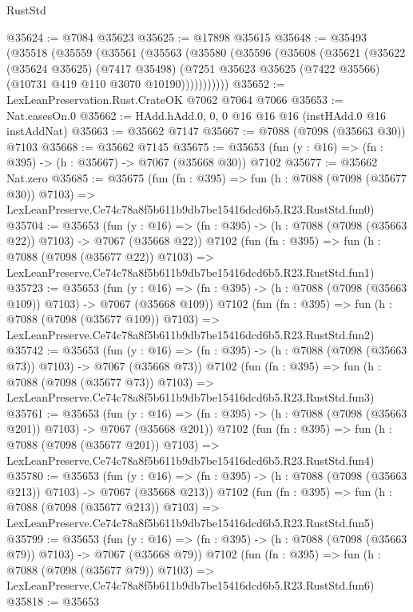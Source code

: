 \begin{lexlean}{RustStd}
\begin{coremodule}
@35624 := @7084 @35623
@35625 := @17898 @35615
@35648 := @35493
    (@35518
      (@35559
        (@35561
          (@35563
            (@35580
              (@35596
                (@35608
                  (@35621
                    (@35622
                      (@35624 @35625)
                      (@7417 @35498)
                      (@7251 @35623 @35625 (@7422 @35566) (@10731 @419 @110 @3070 @10190)))))))))))
@35652 := LexLeanPreservation.Rust.CrateOK @7062 @7064 @7066
@35653 := Nat.casesOn.{0}
@35662 := HAdd.hAdd.{0, 0, 0} @16 @16 @16 (instHAdd.{0} @16 instAddNat)
@35663 := @35662 @7147
@35667 := @7088 (@7098 (@35663 @30)) @7103
@35668 := @35662 @7145
@35675 := @35653 (fun (y : @16) => (fn : @395) -> (h : @35667) -> @7067 (@35668 @30)) @7102
@35677 := @35662 Nat.zero
@35685 := @35675
    (fun (fn : @395) =>
    fun (h : @7088 (@7098 (@35677 @30)) @7103) =>
    LexLeanPreserve.Ce74c78a8f5b611b9db7be15416dcd6b5.R23.RustStd.fun0)
@35704 := @35653
    (fun (y : @16) => (fn : @395) -> (h : @7088 (@7098 (@35663 @22)) @7103) -> @7067 (@35668 @22))
    @7102
    (fun (fn : @395) =>
    fun (h : @7088 (@7098 (@35677 @22)) @7103) =>
    LexLeanPreserve.Ce74c78a8f5b611b9db7be15416dcd6b5.R23.RustStd.fun1)
@35723 := @35653
    (fun (y : @16) => (fn : @395) -> (h : @7088 (@7098 (@35663 @109)) @7103) -> @7067 (@35668 @109))
    @7102
    (fun (fn : @395) =>
    fun (h : @7088 (@7098 (@35677 @109)) @7103) =>
    LexLeanPreserve.Ce74c78a8f5b611b9db7be15416dcd6b5.R23.RustStd.fun2)
@35742 := @35653
    (fun (y : @16) => (fn : @395) -> (h : @7088 (@7098 (@35663 @73)) @7103) -> @7067 (@35668 @73))
    @7102
    (fun (fn : @395) =>
    fun (h : @7088 (@7098 (@35677 @73)) @7103) =>
    LexLeanPreserve.Ce74c78a8f5b611b9db7be15416dcd6b5.R23.RustStd.fun3)
@35761 := @35653
    (fun (y : @16) => (fn : @395) -> (h : @7088 (@7098 (@35663 @201)) @7103) -> @7067 (@35668 @201))
    @7102
    (fun (fn : @395) =>
    fun (h : @7088 (@7098 (@35677 @201)) @7103) =>
    LexLeanPreserve.Ce74c78a8f5b611b9db7be15416dcd6b5.R23.RustStd.fun4)
@35780 := @35653
    (fun (y : @16) => (fn : @395) -> (h : @7088 (@7098 (@35663 @213)) @7103) -> @7067 (@35668 @213))
    @7102
    (fun (fn : @395) =>
    fun (h : @7088 (@7098 (@35677 @213)) @7103) =>
    LexLeanPreserve.Ce74c78a8f5b611b9db7be15416dcd6b5.R23.RustStd.fun5)
@35799 := @35653
    (fun (y : @16) => (fn : @395) -> (h : @7088 (@7098 (@35663 @79)) @7103) -> @7067 (@35668 @79))
    @7102
    (fun (fn : @395) =>
    fun (h : @7088 (@7098 (@35677 @79)) @7103) =>
    LexLeanPreserve.Ce74c78a8f5b611b9db7be15416dcd6b5.R23.RustStd.fun6)
@35818 := @35653

\end{coremodule}
\end{lexlean}
